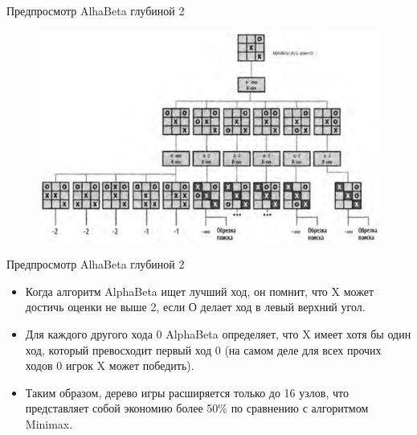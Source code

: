 \documentclass{beamer}
\begin{document}
\begin{frame}{Предпросмотр AlhaBeta глубиной 2}
\begin{figure}[h]
\centering
\includegraphics[scale=0.6]{images/lec05-pic09.png}
\end{figure}
\end{frame}

\begin{frame}{Предпросмотр AlhaBeta глубиной 2}
\begin{itemize}
\item Когда алгоритм AlphaBeta ищет лучший ход, он помнит, что X может
достичь оценки не выше 2, если О делает ход в левый верхний угол. 
\item Для каждого другого хода 0 AlphaBeta определяет, что X имеет хотя бы один ход, который превосходит первый ход 0 (на самом деле для всех прочих ходов 0 игрок X может победить).
\item Таким образом, дерево игры расширяется только до 16 узлов, что представляет собой экономию более 50\% по сравнению с алгоритмом Minimax. 
\end{itemize}
\end{frame}
\end{document}

